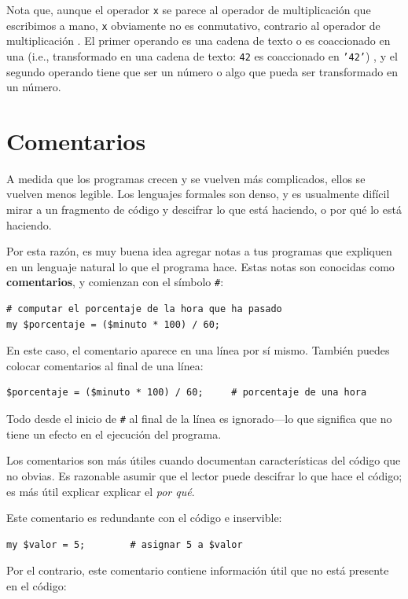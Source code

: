 Nota que, aunque el operador {\tt x} se parece al operador
de multiplicación que escribimos a mano, {\tt x} obviamente 
no es conmutativo, contrario al operador de multiplicación 
{\tt *}. El primer operando es una cadena de texto o es coaccionado
en una (i.e., transformado en una cadena de texto:
{\tt 42} es coaccionado en {\tt '42'})  , y el segundo operando
tiene que ser un número o algo que pueda ser transformado en 
un número.


\section{Comentarios}

A medida que los programas crecen y se vuelven más complicados,
ellos se vuelven menos legible. Los lenguajes formales son denso, y es usualmente
difícil mirar a un fragmento de código y descifrar lo que está haciendo,
o por qué lo está haciendo.

Por esta razón, es muy buena idea agregar notas a tus programas que expliquen en un
lenguaje natural lo que el programa hace. Estas notas son conocidas como {\bf comentarios},
y comienzan con el símbolo \verb|#|:

\begin{lstlisting}
# computar el porcentaje de la hora que ha pasado
my $porcentaje = ($minuto * 100) / 60;
\end{lstlisting}
%
En este caso, el comentario aparece en una línea por sí mismo. También puedes
colocar comentarios al final de una línea:

\begin{lstlisting}
$porcentaje = ($minuto * 100) / 60;     # porcentaje de una hora
\end{lstlisting}
%
Todo desde el inicio de {\tt \#} al final de la línea es ignorado---lo que significa
que no tiene un efecto en el ejecución del programa.

Los comentarios son más útiles cuando documentan características del código
que no obvias. Es razonable asumir que el lector puede descifrar lo que 
hace el código; es más útil explicar explicar el {\em por qué}.

Este comentario es redundante con el código e inservible:

\begin{lstlisting}
my $valor = 5;        # asignar 5 a $valor
\end{lstlisting}
%
Por el contrario, este comentario contiene información útil que no está
presente en el código:

